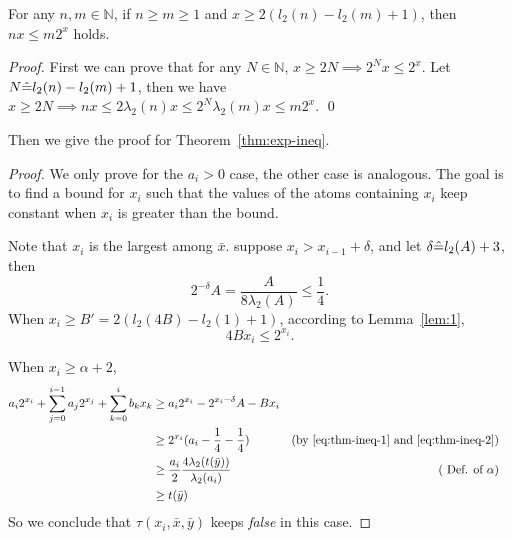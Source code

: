 {\begin{lemma} \label{lem:1}
For any $n,m\in \mathbb{N}$, if $n\ge m\ge 1$ and $x\ge 2(l_2(n)-l_2(m)+1)$, then 
$nx\le m2^x$ holds.
\end{lemma}

\begin{proof}
First we can prove that for any $N\in \mathbb{N}$, $x\ge 2N \implies 2^N x\le 2^x$. Let $N\hat{=} l_2(n)-l_2(m)+1$, then we have $x\ge  2N \implies n x\le 2\lambda_2(n) x\le 2^N \lambda_2(m) x \le m 2^x $. \qed 
\end{proof}


Then we give the proof for Theorem~\ref{thm:exp-ineq}.
\begin{proof}
We only prove for the $a_i > 0$ case, the other case is analogous. 
The goal is to find a bound for $x_i$ such that 
the values of the atoms containing $x_i$ keep constant when $x_i$ is greater than the bound.

Note that $x_i$ is the largest among $\bar{x}$. 
suppose $x_i > x_{i-1} + \delta$, and let 
 $\delta \hat{=}  l_2(A)+3$, then 
 \begin{equation} 
   2^{-\delta}A = \frac{A}{8\lambda_2(A)}\le \frac{1}{4}.   \label{eq:thm-ineq-1}
 \end{equation}
 When $x_i \ge B' = 2(l_2(4B)-l_2(1)+1)$, according to Lemma~\ref{lem:1}, 
\begin{equation} 
    4 B x_i \le 2^{x_i}. \label{eq:thm-ineq-2}
\end{equation}
 
When $x_i \ge \alpha+2$,
\begin{align}
    a_i2^{x_i}+ \sum_{j=0}^{i-1} a_j 2^{x_j} + \sum_{k=0}^{i} b_k x_k 
    & \ge a_i 2^{x_i} - 2^{x_i -\delta}A  - Bx_i & \notag \\
     & \ge 2^{x_i}(a_i -\frac{1}{4} -\frac{1}{4}) &  (\mbox{by \eqref{eq:thm-ineq-1} and  \eqref{eq:thm-ineq-2}})\notag \\
    & \ge  \frac{a_i}{2}\frac{4\lambda_2(t(\bar{y}))}{\lambda_2(a_i)} & 
      (\mbox{ Def. of } \alpha) & \notag \\
     & \ge  t(\bar{y}) & \notag 
\end{align}
So we conclude that %
$\tau(x_i,\bar{x},\bar{y})$ keeps \textit{false} in this case.


\end{proof}}
